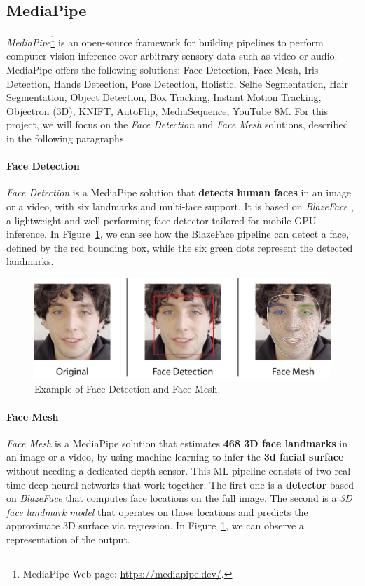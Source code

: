 \documentclass[preprint]{elsarticle}
\begin{document}
\subsection{MediaPipe}\label{sect:mediapipe}

\emph{MediaPipe}\footnote{MediaPipe Web page: \url{https://mediapipe.dev/}.}  is an open-source framework for building pipelines to perform computer vision  inference over arbitrary sensory data such as video or audio. MediaPipe offers the following solutions:
Face Detection, Face Mesh,  Iris Detection, Hands Detection, Pose Detection, Holistic, Selfie Segmentation, Hair Segmentation, Object Detection, Box Tracking, Instant Motion Tracking, Objectron (3D), KNIFT, AutoFlip, MediaSequence, YouTube 8M. For this project, we will focus on the \emph{Face Detection} and \emph{Face Mesh} solutions, described in the following paragraphs.

\paragraph{Face Detection}


\emph{Face Detection} is a MediaPipe solution that \textbf{detects human faces} in an image or a video,
with six landmarks and multi-face support.
It is based on \emph{BlazeFace} \cite{bazarevsky2019blazeface}, a lightweight and well-performing 
face detector tailored for mobile GPU inference.
In Figure~\ref{fig:MediapipeDemo}, we can see how the BlazeFace pipeline can detect a face, defined by the red bounding box, while the six green dots represent the detected landmarks.

\begin{figure}[t]
	\centering
	\includegraphics[scale=0.65, keepaspectratio]{img/background_img/MediapipeDemo.png}
	\caption{Example of Face Detection and Face Mesh.}\label{fig:MediapipeDemo}
\end{figure}


\paragraph{Face Mesh}
\emph{Face Mesh} is a MediaPipe solution that estimates \textbf{468 3D face landmarks} in an image or a video,
by using machine learning to infer the \textbf{3d facial surface} without needing a dedicated depth sensor.
This ML pipeline consists of two real-time deep neural networks that work together.
The first one is a \textbf{detector} based on \emph{BlazeFace} that computes face locations on the full image.
The second is a \emph{3D face landmark model} \cite{kartynnik2019realtime} that operates on those locations and predicts the 
approximate 3D surface via regression. In Figure~\ref{fig:MediapipeDemo}, we can observe a representation of the output.
\end{document}
